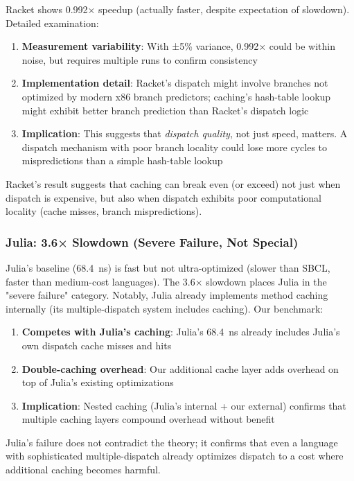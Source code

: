 \documentclass[sigplan,final,acmsmall,review,screen]{acmart}
\begin{document}
Racket shows 0.992× speedup (actually faster, despite expectation of slowdown). Detailed examination:

\begin{enumerate}
  \item \textbf{Measurement variability}: With ±5\% variance, 0.992× could be within noise, but requires multiple runs to confirm consistency
  \item \textbf{Implementation detail}: Racket's dispatch might involve branches not optimized by modern x86 branch predictors;
    caching's hash-table lookup might exhibit better branch prediction than Racket's dispatch logic
  \item \textbf{Implication}: This suggests that \textit{dispatch quality}, not just speed, matters. A dispatch mechanism with poor branch locality
    could lose more cycles to mispredictions than a simple hash-table lookup
\end{enumerate}

Racket's result suggests that caching can break even (or exceed) not just when dispatch is expensive, but also when
dispatch exhibits poor computational locality (cache misses, branch mispredictions).

\subsubsection{Julia: 3.6× Slowdown (Severe Failure, Not Special)}

Julia's baseline (68.4~ns) is fast but not ultra-optimized (slower than SBCL, faster than medium-cost languages).
The 3.6× slowdown places Julia in the "severe failure" category. Notably, Julia already implements method caching internally
(its multiple-dispatch system includes caching). Our benchmark:

\begin{enumerate}
  \item \textbf{Competes with Julia's caching}: Julia's 68.4~ns already includes Julia's own dispatch cache misses and hits
  \item \textbf{Double-caching overhead}: Our additional cache layer adds overhead on top of Julia's existing optimizations
  \item \textbf{Implication}: Nested caching (Julia's internal + our external) confirms that multiple caching layers compound overhead without benefit
\end{enumerate}

Julia's failure does not contradict the theory; it confirms that even a language with sophisticated multiple-dispatch
already optimizes dispatch to a cost where additional caching becomes harmful.
\end{document}
